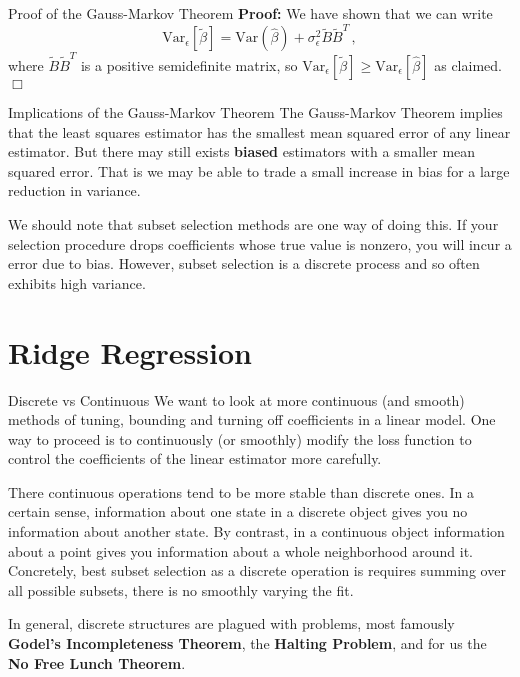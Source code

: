 \documentclass[10pt, table, dvipsnames,xcdraw,handout]{beamer}
\begin{document}
\begin{frame}[fragile]{Proof of the Gauss-Markov Theorem} 
\textbf{Proof:} We have shown that we can write
$$
\text{Var}_\epsilon[\widetilde{\beta}] = \text{Var}(\hat \beta) + \sigma^2_\epsilon \widetilde{B}\widetilde{B}^T\,,
$$
where $\widetilde{B}\widetilde{B}^T$ is a positive semidefinite matrix, so $\text{Var}_\epsilon[\widetilde{\beta}] \geq \text{Var}_\epsilon[\hat{\beta}] $ as claimed. \hfill $\Box$
\end{frame}



\begin{frame}[fragile]{Implications of the Gauss-Markov Theorem} 
The Gauss-Markov Theorem implies that the least squares estimator has the smallest mean squared error of any  linear estimator. But there may still exists \textbf{biased} estimators with a smaller mean squared error. \pause That is we may be able to trade a small increase in bias for a large reduction in variance. 

We should note that subset selection methods are one way of doing this. If your selection procedure drops coefficients whose true value is nonzero, you will incur a error due to bias. \pause However, subset selection is a discrete process and so often exhibits high variance.
\end{frame}





\section{Ridge Regression}



\begin{frame}[fragile]{Discrete vs Continuous} 
We want to look at more continuous (and smooth) methods of tuning, bounding and turning off coefficients in a linear model. One way to proceed is to continuously (or smoothly) modify the loss function to control the coefficients of the linear estimator more carefully.  

There  continuous operations tend to be more stable than discrete ones. In a certain sense, information about one state in a discrete object gives you no information about another state. By contrast, in a continuous object information about a point gives you information about a whole neighborhood around it. Concretely, best subset selection as a discrete operation is requires summing over all possible subsets, there is no smoothly varying the  fit.  \pause 

In general, discrete structures are plagued with problems, most famously \textbf{Godel's Incompleteness Theorem}, the \textbf{Halting Problem}, and for us the \textbf{No Free Lunch Theorem}.
\end{frame}
\end{document}
